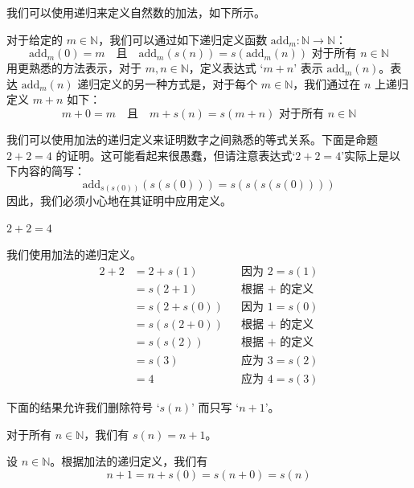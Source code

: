 \begin{example}
我们可以使用递归来定义自然数的加法，如下所示。

对于给定的 $m \in \mathbb{N}$，我们可以通过如下递归定义函数 $\mathrm{add}_m : \mathbb{N} \to \mathbb{N}$：
\[ \mathrm{add}_m(0) = m \quad \text{且} \quad \mathrm{add}_m(s(n)) = s(\mathrm{add}_m(n)) \text{ 对于所有 } n \in \mathbb{N} \]
用更熟悉的方法表示，对于 $m,n \in \mathbb{N}$，定义表达式 `$m+n$' 表示 $\mathrm{add}_m(n)$。表达 $\mathrm{add}_m(n)$ 递归定义的另一种方式是，对于每个 $m \in \mathbb{N}$，我们通过在 $n$ 上递归定义 $m+n$ 如下：
\[ m+0 = m \quad \text{且} \quad m+s(n) = s(m+n) \text{ 对于所有 } n \in \mathbb{N} \]
\end{example}

我们可以使用加法的递归定义来证明数字之间熟悉的等式关系。下面是命题 $2+2=4$ 的证明。这可能看起来很愚蠢，但请注意表达式`$2+2=4$'实际上是以下内容的简写：
\[ \mathrm{add}_{s(s(0))} (s(s(0))) = s(s(s(s(0)))) \]
因此，我们必须小心地在其证明中应用定义。

\begin{proposition}
\label{propTwoPlusTwoEqualsFour}
$2+2=4$
\end{proposition}

\begin{cproof}
我们使用加法的递归定义。
\begin{align*}
2 + 2 &= 2 + s(1) && \text{因为 $2=s(1)$} \\
&= s(2+1) && \text{根据 $+$ 的定义} \\
&= s(2+s(0)) && \text{因为 $1=s(0)$} \\
&= s(s(2+0)) && \text{根据 $+$ 的定义} \\
&= s(s(2)) && \text{根据 $+$ 的定义} \\
&= s(3) && \text{应为 $3=s(2)$} \\
&= 4 && \text{应为 $4=s(3)$}
\end{align*}
\end{cproof}

下面的结果允许我们删除符号 `$s(n)$' 而只写 `$n+1$'。

\begin{proposition}
\label{propSuccessorIsPlusOne}
对于所有 $n \in \mathbb{N}$，我们有 $s(n) = n+1$。
\end{proposition}

\begin{cproof}
设 $n \in \mathbb{N}$。根据加法的递归定义，我们有
\[ n+1 = n+s(0) = s(n+0) = s(n) \]
\end{cproof}

